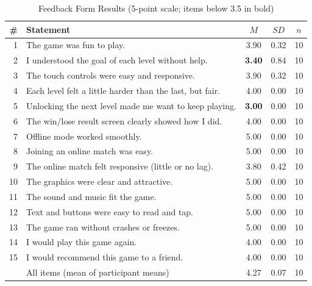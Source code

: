 \documentclass[conference]{IEEEtran}
\begin{document}
\begin{table}[t]
\caption{Feedback Form Results (5-point scale; items below 3.5 in bold)}
\label{tab:likert}
\centering
\footnotesize
\begin{tabular}{@{}rp{4.5cm}ccc@{}}
\toprule
\# & Statement & $M$ & $SD$ & $n$ \\
\midrule
1 & The game was fun to play. & 3.90 & 0.32 & 10 \\
2 & I understood the goal of each level without help. & \textbf{3.40} & 0.84 & 10 \\
3 & The touch controls were easy and responsive. & 3.90 & 0.32 & 10 \\
4 & Each level felt a little harder than the last, but fair. & 4.00 & 0.00 & 10 \\
5 & Unlocking the next level made me want to keep playing. & \textbf{3.00} & 0.00 & 10 \\
6 & The win/lose result screen clearly showed how I did. & 4.00 & 0.00 & 10 \\
7 & Offline mode worked smoothly. & 5.00 & 0.00 & 10 \\
8 & Joining an online match was easy. & 5.00 & 0.00 & 10 \\
9 & The online match felt responsive (little or no lag). & 3.80 & 0.42 & 10 \\
10 & The graphics were clear and attractive. & 5.00 & 0.00 & 10 \\
11 & The sound and music fit the game. & 5.00 & 0.00 & 10 \\
12 & Text and buttons were easy to read and tap. & 5.00 & 0.00 & 10 \\
13 & The game ran without crashes or freezes. & 5.00 & 0.00 & 10 \\
14 & I would play this game again. & 4.00 & 0.00 & 10 \\
15 & I would recommend this game to a friend. & 4.00 & 0.00 & 10 \\
\midrule
 & All items (mean of participant means) & 4.27 & 0.07 & 10 \\
\bottomrule
\end{tabular}
\end{table}
\end{document}
